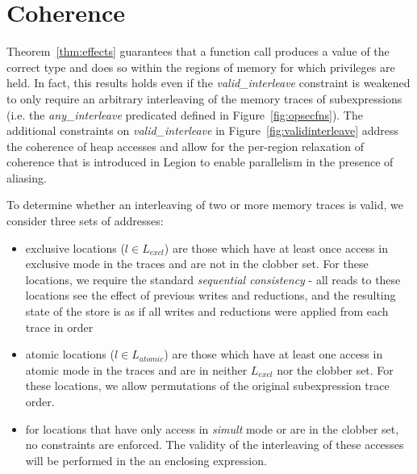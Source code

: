 \section{Coherence}
\label{sec:coherence}

Theorem~\ref{thm:effects} guarantees that a function call produces a value of the
correct type and does so within the regions of memory for which privileges are held.  In fact, this results holds
even if the {\em valid\_interleave} constraint is weakened to only require an arbitrary interleaving of the memory
traces of subexpressions (i.e. the {\em any\_interleave} predicated defined in Figure~\ref{fig:opsecfns}).  The 
additional constraints on {\em valid\_interleave} in Figure~\ref{fig:validinterleave} address the coherence of 
heap accesses and allow for the per-region relaxation of coherence that is introduced in Legion to enable parallelism
in the presence of aliasing.

To determine whether an interleaving of two or more memory traces is valid, we consider three sets of addresses:
\begin{itemize}
\item exclusive locations ($l \in L_{excl}$) are those which have at least once access in exclusive mode in the traces
and are not in the clobber set.  For these locations, we require the standard {\em sequential consistency} - all
reads to these locations see the effect of previous writes and reductions, and the resulting state of the store is
as if all writes and reductions were applied from each trace in order
\item atomic locations ($l \in L_{atomic}$) are those which have at least one access in atomic mode in the traces and
are in neither $L_{excl}$ nor the clobber set.  For these locations, we allow permutations of the original
subexpression trace order.
\item for locations that have only access in {\em simult} mode or are in the clobber set, no constraints are
enforced.  The validity of the interleaving of these accesses will be performed in the an enclosing expression.
\end{itemize}

